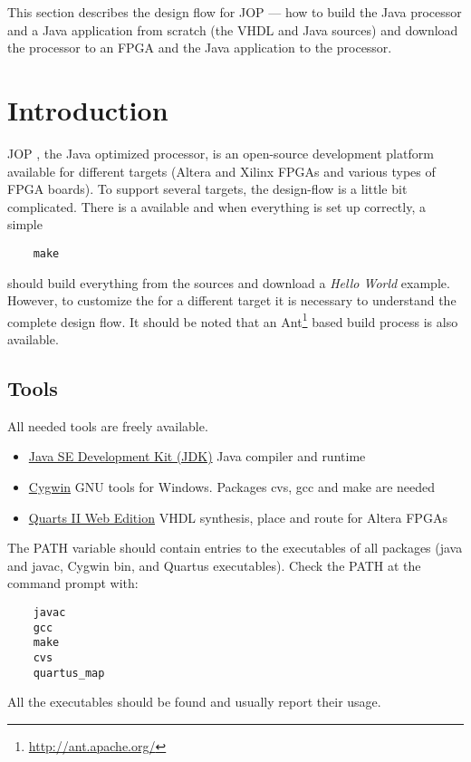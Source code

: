
This section describes the design flow for JOP --- how to build the
Java processor and a Java application from scratch (the VHDL and
Java sources) and download the processor to an FPGA and the Java
application to the processor.


\section{Introduction}

JOP \cite{jop:thesis}, the Java optimized processor, is an
open-source development platform available for different targets
(Altera and Xilinx FPGAs and various types of FPGA boards). To
support several targets, the design-flow is a little bit complicated.
There is a  available and when everything is set up
correctly, a simple
%
\begin{verbatim}
    make
\end{verbatim}
%
should build everything from the sources and download a \emph{Hello
World} example. However, to customize the  for a
different target it is necessary to understand the complete design
flow. It should be noted that an
Ant\footnote{\url{http://ant.apache.org/}} based build process is
also available.

\subsection{Tools}

All needed tools are freely available.
%
\begin{itemize}
    \item  \href{http://java.sun.com/javase/downloads/index.jsp}%
{Java SE Development Kit (JDK)}  Java compiler and runtime
    \item  \href{http://www.cygwin.com/}%
{Cygwin} GNU tools for Windows. Packages cvs, gcc and make are
needed
    \item  \href{https://www.altera.com/support/software/download/altera_design/quartus_we/dnl-quartus_we.jsp}%
{Quarts II Web Edition} VHDL synthesis, place and route for Altera
FPGAs

\end{itemize}
%
The PATH variable should contain entries to the executables of all
packages (java and javac, Cygwin bin, and Quartus executables). Check
the PATH at the command prompt with:
%
\begin{verbatim}
    javac
    gcc
    make
    cvs
    quartus_map
\end{verbatim}
%
All the executables should be found and usually report their usage.

